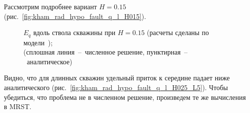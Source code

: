 \documentclass{article}
\begin{document}
Рассмотрим подробнее вариант $H=0.15$ (рис.~\ref{fig:kham_rad_hypo_fault_q_l_H015}).
\begin{figure}[h!]
\centering
\begin{subfigure}{0.45\textwidth}

\caption{}
\label{fig:kham_rad_hypo_fault_q_l_constH015_L05}
\end{subfigure}
\hfill
\begin{subfigure}{0.45\textwidth}

\caption{}
\label{fig:kham_rad_hypo_fault_q_l_constH015_L1}
\end{subfigure}

\begin{subfigure}{0.45\textwidth}

\caption{}
\label{fig:kham_rad_hypo_fault_q_l_constH015_L2}
\end{subfigure}
\hfill
\begin{subfigure}{0.45\textwidth}

\caption{}
\label{fig:kham_rad_hypo_fault_q_l_constH015_L3}
\end{subfigure}

\begin{subfigure}{0.45\textwidth}

\caption{}
\label{fig:kham_rad_hypo_fault_q_l_constH015_L5}
\end{subfigure}
\hfill
\begin{subfigure}{0.45\textwidth}

\caption{}
\label{fig:kham_rad_hypo_fault_q_l_constH015_L10}
\end{subfigure}

\caption{
$E_q$ вдоль ствола скважины при $H=0.15$
(расчеты сделаны по модели~\cite{lit:kham_mazo_uzku_2015}); \\
(сплошная линия~--~численное решение, пунктирная~--~аналитическое)}
\label{fig:kham_rad_hypo_fault_q_l_constH015}
\end{figure}

Видно, что для длинных скважин удельный приток к середине падает ниже аналитического (рис.~\ref{fig:kham_rad_hypo_fault_q_l_H025_L5}). Чтобы убедиться, что проблема не в численном решение, произведем те же вычисления в MRST.
\end{document}
